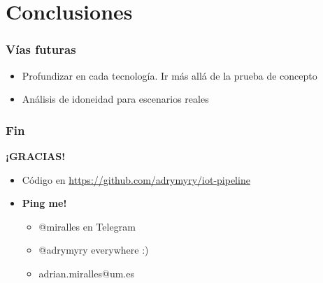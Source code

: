 \documentclass[12pt]{beamer}
\begin{document}
        \section{Conclusiones}

        \begin{frame}
            \frametitle{Vías futuras}

            \begin{itemize}
                \item Profundizar en cada tecnología. Ir más allá de la prueba de concepto
                \item Análisis de idoneidad para escenarios reales
            \end{itemize}
        \end{frame}

        \begin{frame}
            \frametitle{Fin}

            \begin{center}
                \Huge \textbf{¡GRACIAS!}
            \end{center}

            \begin{itemize}
                \item Código en \url{https://github.com/adrymyry/iot-pipeline}
                \item \textbf{Ping me!}
                \begin{itemize}
                    \item @miralles en Telegram
                    \item @adrymyry everywhere :)
                    \item adrian.miralles@um.es
                \end{itemize}
            \end{itemize}
            
        \end{frame}

    
\end{document}

